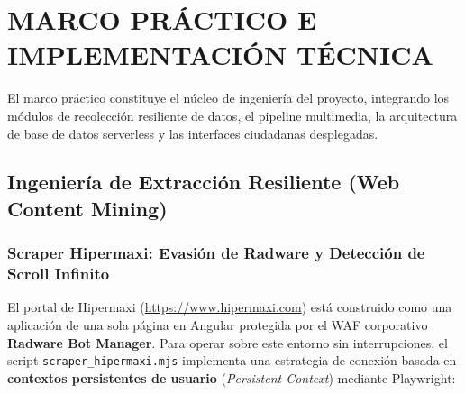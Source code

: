 \section{MARCO PRÁCTICO E IMPLEMENTACIÓN TÉCNICA}

El marco práctico constituye el núcleo de ingeniería del proyecto, integrando los módulos de recolección resiliente de datos, el pipeline multimedia, la arquitectura de base de datos serverless y las interfaces ciudadanas desplegadas.

\subsection{Ingeniería de Extracción Resiliente (Web Content Mining)}

\subsubsection{Scraper Hipermaxi: Evasión de Radware y Detección de Scroll Infinito}
El portal de Hipermaxi (\url{https://www.hipermaxi.com}) está construido como una aplicación de una sola página en Angular protegida por el WAF corporativo \textbf{Radware Bot Manager}. Para operar sobre este entorno sin interrupciones, el script \texttt{scraper\_hipermaxi.mjs} implementa una estrategia de conexión basada en \textbf{contextos persistentes de usuario} (\textit{Persistent Context}) mediante Playwright:

